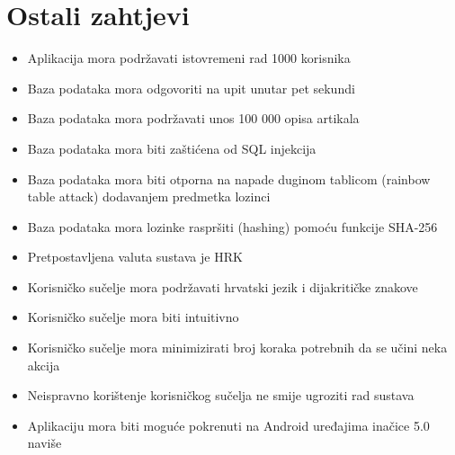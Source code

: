 		\section{Ostali zahtjevi}
        
        \begin{itemize}
            \item Aplikacija mora podržavati istovremeni rad 1000 korisnika
            \item Baza podataka mora odgovoriti na upit unutar pet sekundi
            \item Baza podataka mora podržavati unos 100 000 opisa artikala
            \item Baza podataka mora biti zaštićena od SQL injekcija
            \item Baza podataka mora biti otporna na napade duginom tablicom (rainbow table attack) dodavanjem predmetka lozinci
            \item Baza podataka mora lozinke raspršiti (hashing) pomoću funkcije SHA-256
            \item Pretpostavljena valuta sustava je HRK
            \item Korisničko sučelje mora podržavati hrvatski jezik i dijakritičke znakove
            \item Korisničko sučelje mora biti intuitivno
            \item Korisničko sučelje mora minimizirati broj koraka potrebnih da se učini neka akcija
            \item Neispravno korištenje korisničkog sučelja ne smije ugroziti rad sustava
            \item Aplikaciju mora biti moguće pokrenuti na Android uređajima inačice 5.0 naviše
        \end{itemize}
		 
			 
			 
			 
	
